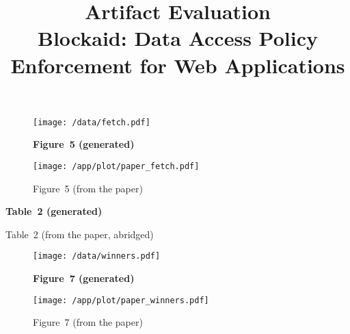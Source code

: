 \documentclass{article}
\title{\textbf{Artifact Evaluation}\\Blockaid: Data Access Policy Enforcement for Web Applications}
\author{}
\date{}
\begin{document}
\maketitle

\begin{figure}[H]\centering
    \texttt{[image: /data/fetch.pdf]}
    \caption*{\bf Figure~5 (generated)}
\end{figure}

\begin{figure}[H]\centering
    \texttt{[image: /app/plot/paper\_fetch.pdf]}
    \caption*{Figure~5 (from the paper)}
\end{figure}

\begin{table}[H]
\caption*{\bf Table~2 (generated)}
\small\centering

\end{table}

\begin{table}[H]
\caption*{Table~2 (from the paper, abridged)}
\small\centering

\end{table}

\begin{figure}[H]\centering
    \begin{minipage}{.48\textwidth}
        \texttt{[image: /data/winners.pdf]}
        \caption*{\bf Figure~7 (generated)}
    \end{minipage}\hfill%
    \begin{minipage}{.48\textwidth}
        \texttt{[image: /app/plot/paper\_winners.pdf]}
        \caption*{Figure~7 (from the paper)}
    \end{minipage}
\end{figure}
\end{document}
